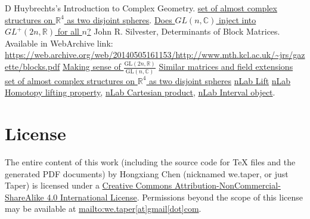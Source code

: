 \documentclass{article}
\numberwithin{equation}{subsection} %
\theoremstyle{definition}
\begin{document}
\begin{thebibliography}{1}
     D Huybrechts's Introduction to Complex Geometry.
     \href{http://math.stackexchange.com/questions/923957/set-of-almost-complex-structures-on-mathbb-r4-as-two-disjoint-spheres}{set of almost complex structures on $\mathbb{R}^4$ as two disjoint spheres}.
     \href{http://math.stackexchange.com/questions/1356823/does-gln-mathbbc-inject-into-gl2n-mathbbr-for-all-n}{Does $GL(n,\mathbb{C})$ inject into $GL^+(2n, \mathbb{R})$ for all $n$?}
     John R. Silvester, 
      Determinants of Block Matrices. Available in WebArchive link:
      \url{https://web.archive.org/web/20140505161153/http://www.mth.kcl.ac.uk/~jrs/gazette/blocks.pdf}
     \href{http://math.stackexchange.com/questions/1927487/making-sense-of-frac-mathrmgl2n-mathbbr-mathrmgln-mathbbc/1927518?noredirect=1#comment3957369_1927518}{Making sense of $\frac{\mathrm{GL}(2n,\mathbb{R})}{\mathrm{GL}(n,\mathbb{C})}$}
     \href{http://math.stackexchange.com/questions/57242/similar-matrices-and-field-extensions?noredirect=1&lq=1}
      {Similar matrices and field extensions}
     \href{http://math.stackexchange.com/questions/923957/set-of-almost-complex-structures-on-mathbb-r4-as-two-disjoint-spheres}{set of almost complex structures on $\mathbb{R}^4$ as two disjoint spheres}
    \href{https://ncatlab.org/nlab/show/lift}{nLab Lift}
    \href{https://ncatlab.org/nlab/show/homotopy+lifting+property}{nLab Homotopy lifting property}, \href{https://ncatlab.org/nlab/show/cartesian+product}{nLab Cartesian product}, \href{https://ncatlab.org/nlab/show/interval+object}{nLab Interval object}.
\end{thebibliography}
\printnomenclature


\section{License}
The entire content of this work (including the source code
for TeX files and the generated PDF documents) by 
Hongxiang Chen (nicknamed we.taper, or just Taper) is
licensed under a 
\href{http://creativecommons.org/licenses/by-nc-sa/4.0/}{Creative 
Commons Attribution-NonCommercial-ShareAlike 4.0 International 
License}. Permissions beyond the scope of this 
license may be available at \url{mailto:we.taper[at]gmail[dot]com}.
\end{document}
